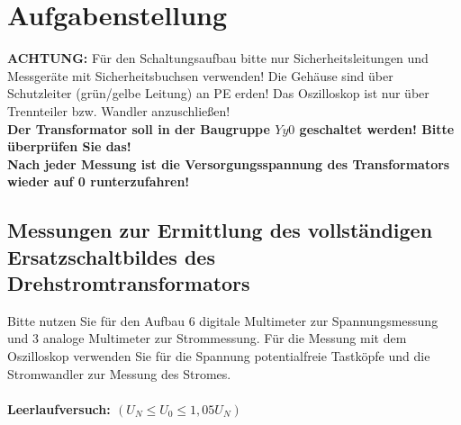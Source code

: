 \section{Aufgabenstellung }
\textbf{ACHTUNG:} Für den Schaltungsaufbau bitte nur Sicherheitsleitungen und Messgeräte mit Sicherheitsbuchsen verwenden! Die Gehäuse sind über Schutzleiter (grün/gelbe Leitung) an PE erden! Das Oszilloskop ist nur über Trennteiler bzw. Wandler anzuschließen! \\
\textbf{Der Transformator soll in der Baugruppe $Yy0$ geschaltet werden! Bitte überprüfen Sie das! \\
  Nach jeder Messung ist die Versorgungsspannung des Transformators wieder auf 0 runterzufahren!}
\subsection{Messungen zur Ermittlung des vollständigen Ersatzschaltbildes des Drehstromtransformators}
Bitte nutzen Sie für den Aufbau 6 digitale Multimeter zur Spannungsmessung und
3 analoge Multimeter zur Strommessung. Für die Messung mit dem Oszilloskop
verwenden Sie für die Spannung potentialfreie Tastköpfe und die Stromwandler
zur Messung des Stromes. \\\ \\ \textbf{Leerlaufversuch: $(U_N \leq U_0 \leq
    1,05 U_N)$}
